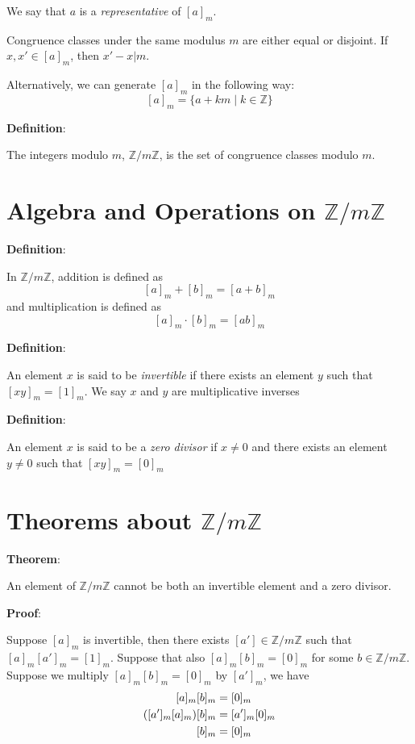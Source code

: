 \documentclass{article}
\begin{document}
\begin{multicols*}{2}
We say that $a$ is a \textit{representative} of $[a]_m$.

Congruence classes under the same modulus $m$ are either equal or disjoint. If $x, x' \in [a]_m$, then $x' - x | m$.

Alternatively, we can generate $[a]_m$ in the following way:\[[a]_m = \{a + km \;|\; k \in \mathbb{Z}\}\]

\textbf{Definition}:

The integers modulo $m$, $\mathbb{Z}/m\mathbb{Z}$, is the set of congruence classes modulo $m$.

\section{Algebra and Operations on $\mathbb{Z}/m\mathbb{Z}$}

\textbf{Definition}:

In $\mathbb{Z}/m\mathbb{Z}$, addition is defined as \[[a]_m+[b]_m = [a+b]_m\]
and multiplication is defined as \[[a]_m \cdot [b]_m = [ab]_m\]

\textbf{Definition}:

An element $x$ is said to be \textit{invertible} if there exists an element $y$ such that $[xy]_m = [1]_m$. We say $x$ and $y$ are multiplicative inverses

\textbf{Definition}:

An element $x$ is said to be a \textit{zero divisor} if $x \neq 0$ and there exists an element $y \neq 0$ such that $[xy]_m = [0]_m$

\section{Theorems about $\mathbb{Z}/m\mathbb{Z}$}

\textbf{Theorem}:

An element of $\mathbb{Z}/m\mathbb{Z}$ cannot be both an invertible element and a zero divisor.

\textbf{Proof}:

Suppose $[a]_m$ is invertible, then there exists $[a'] \in \mathbb{Z}/m\mathbb{Z}$ such that $[a]_m[a']_m = [1]_m$. Suppose that also $[a]_m[b]_m = [0]_m$ for some $ b \in \mathbb{Z}/m\mathbb{Z}$. Suppose we multiply $[a]_m[b]_m = [0]_m$ by $[a']_m$, we have \[\begin{aligned}\relax
[a]_m[b]_m &= [0]_m\\
([a']_m[a]_m)[b]_m &= [a']_m[0]_m\\
[b]_m &= [0]_m
\end{aligned}\]


\end{multicols*}
\end{document}
